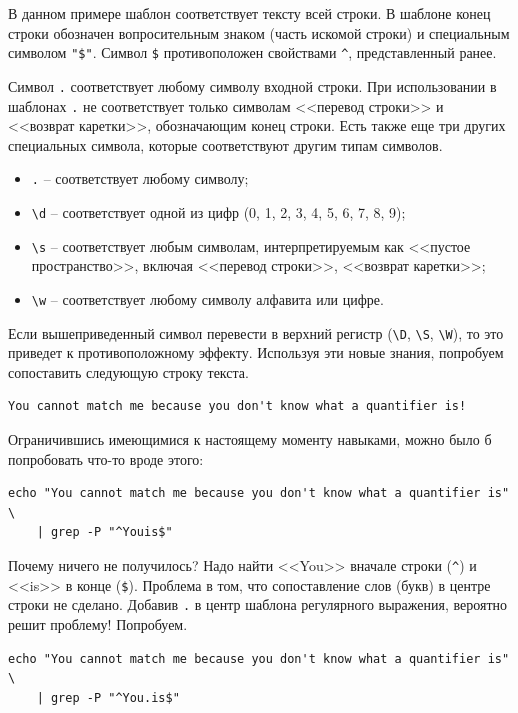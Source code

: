 \documentclass[12pt]{article}
\providecommand{\tightlist}{%
  \setlength{\itemsep}{0pt}\setlength{\parskip}{0pt}}
\begin{document}
В данном примере шаблон соответствует тексту всей строки. В шаблоне
конец строки обозначен вопросительным знаком (часть искомой строки) и
специальным символом \texttt{"\$"}. Символ \texttt{\$} противоположен свойствами
\texttt{\^{}}, представленный ранее.

Символ \texttt{.} соответствует любому символу входной строки. При
использовании в шаблонах \texttt{.} не соответствует только символам
<<перевод строки>> и <<возврат каретки>>, обозначающим конец строки. Есть
также еще три других специальных символа, которые соответствуют другим
типам символов.
\begin{itemize}
\tightlist
\item
  \texttt{.} -- соответствует любому символу;
\item
  \texttt{\textbackslash{}d} -- соответствует одной из цифр (0, 1, 2, 3,
  4, 5, 6, 7, 8, 9);
\item
  \texttt{\textbackslash{}s} -- соответствует любым символам,
  интерпретируемым как <<пустое пространство>>, включая <<перевод строки>>,
  <<возврат каретки>>;
\item
  \texttt{\textbackslash{}w} -- соответствует любому символу алфавита или
  цифре.
\end{itemize}

Если вышеприведенный символ перевести в верхний регистр
(\texttt{\textbackslash{}D}, \texttt{\textbackslash{}S},
\texttt{\textbackslash{}W}), то это приведет к противоположному эффекту. Используя
эти новые знания, попробуем сопоставить следующую строку текста.
\begin{verbatim}
You cannot match me because you don't know what a quantifier is!
\end{verbatim}

Ограничившись имеющимися к настоящему моменту навыками, можно было б попробовать что-то вроде
этого:
\begin{verbatim}
echo "You cannot match me because you don't know what a quantifier is" \
    | grep -P "^Youis$"
\end{verbatim}

Почему ничего не получилось? Надо найти <<You>> вначале строки
(\texttt{\^{}}) и <<is>> в конце (\texttt{\$}). Проблема в том, что
сопоставление слов (букв) в центре строки не сделано. Добавив \texttt{.}
в центр шаблона регулярного выражения, вероятно решит проблему!
Попробуем.

\begin{verbatim}
echo "You cannot match me because you don't know what a quantifier is" \
    | grep -P "^You.is$"
\end{verbatim}
\end{document}
